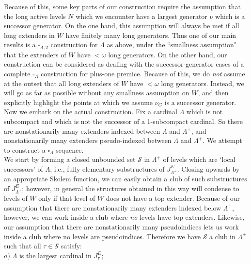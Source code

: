 \documentclass[12pt]{article}
\begin{document}
Because of this, some key parts of our construction require the assumption that the long active levels $N$ which we encounter have a largest generator $\nu$ which is a successor generator.  On the one hand, this assumption will always be met if all long extenders in $W$ have finitely many long generators.  Thus one of our main results is a $\square_{\Lambda, 2}$ construction for $\Lambda$ as above, under the ``smallness assumption" that the extenders of $W$ have $< \omega$ long generators.  On the other hand, our construction can be considered as dealing with the successor-generator cases of a complete $\square_\Lambda$ construction for plus-one premice.  Because of this, we do \textit{not} assume at the outset that all long extenders of $W$ have $< \omega$ long generators.  Instead, we will go as far as possible without any smallness assumption on $W$, and then explicitly highlight the points at which we assume $\nu_G$ is a successor generator.\\




Now we embark on the actual construction. Fix a cardinal $\Lambda$ which is not subcompact and which is not the successor of a 1-subcompact cardinal.  So there are nonstationarily many extenders indexed between $\Lambda$ and $\Lambda^+$, and nonstationarily many extenders pseudo-indexed between $\Lambda$ and $\Lambda^+$.  We attempt to construct a $\square_\Lambda$-sequence.\\


We start by forming a closed unbounded set $\mathscr{S}$ in $\Lambda^+$ of levels which are `local successors' of $\Lambda$, i.e., fully elementary substructures of $J_{\Lambda^+}^E$.  Closing upwards by an appropriate Skolem function, we can easily obtain a club of such substructures of $J_{\Lambda^+}^E$; however, in general the structures obtained in this way will condense to levels of $W$ only if that level of $W$ does not have a top extender.  Because of our assumption that there are nonstationarily many extenders indexed below $\Lambda^+$, however, we can work inside a club where \textit{no} levels have top extenders.  Likewise, our assumption that there are nonstationarily many pseudoindices lets us work inside a club where no levels are pseudoindices.  Therefore we have $\mathcal{S}$ a club in $\Lambda^+$ such that all $\tau \in \mathcal{S}$ satisfy:\\

\indent $a)$ $\Lambda$ is the largest cardinal in $J_\tau^E$;\\
\end{document}
